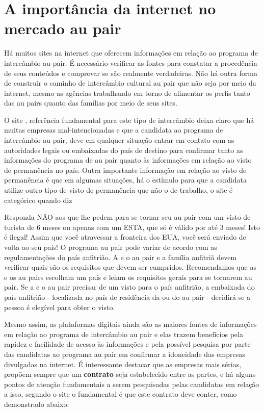     \section{A importância da internet no mercado au pair}
    
    Há muitos sites na internet que oferecem informações em relação ao programa de intercâmbio au pair. É necessário verificar as fontes para constatar a procedência de seus conteúdos e comprovar se são realmente verdadeiras. Não há outra forma de construir o caminho de intercâmbio cultural au pair que não seja por meio da internet, mesmo as agências trabalhando em torno de alimentar os perfis tanto das au pairs quanto das famílias por meio de seus sites.
   
    O site \cite{auPair.com2022}, referência fundamental para este tipo de intercâmbio deixa claro que há muitas empresas mal-intencionadas e que a candidata ao programa de intercâmbio au pair, deve em qualquer situação entrar em contato com as autoridades legais ou embaixadas do país de destino para confirmar tanto as informações do programa de au pair quanto às informações em relação ao visto de permanência no país.
    Outra importante informação em relação ao visto de permanência é que em algumas situações, há o estímulo para que a candidata utilize outro tipo de visto de permanência que não o de trabalho, o site \cite{auPair.com2022} é categórico quando diz
    
    \begin{citacao}
    Responda NÃO aos que lhe pedem para se tornar seu au pair com um visto de turista de 6 meses ou apenas com um ESTA, que só é válido por até 3 meses! Isto é ilegal! Assim que você atravessar a fronteira dos EUA, você será enviado de volta ao seu país! O programa au pair pode variar de acordo com as regulamentações do país anfitrião. A e o au pair e a família anfitriã devem verificar quais são os requisitos que devem ser cumpridos. Recomendamos que as e os au pairs escolham um país e leiam os requisitos gerais para se tornarem au pair. Se a e o au pair precisar de um visto para o país anfitrião, a embaixada do país anfitrião - localizada no país de residência da ou do au pair - decidirá se a pessoa é elegível para obter o visto. 
    \cite{auPair.com2022}
    \end{citacao}
    
    Mesmo assim, as plataformas digitais ainda são as maiores fontes de informações em relação ao programa de intercâmbio au pair e elas trazem benefícios pela rapidez e facilidade de acesso às informações e pela possível pesquisa por parte das candidatas ao programa au pair em confirmar a idoneidade das empresas divulgadas na internet.
    É interessante destacar que as empresas mais sérias, propõem sempre que um \textbf{contrato} seja estabelecido entre as partes, e há alguns pontos de atenção fundamentais a serem pesquisadas pelas candidatas em relação a isso, segundo o site \cite{auPair.com2022} o fundamental é que este contrato deve conter, como demonstrado abaixo:

